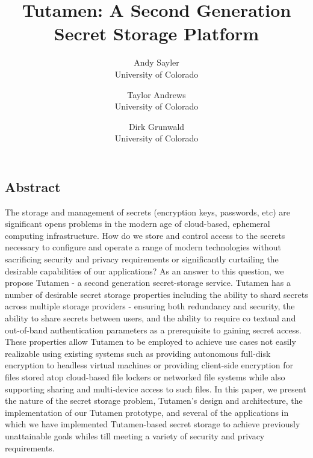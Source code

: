 \documentclass[letterpaper,twocolumn,10pt]{article}
\begin{document}
\date{}

\title{\Large \bf Tutamen: A Second Generation Secret Storage Platform}

\author{
{\rm Andy Sayler}\\
University of Colorado
\and
{\rm Taylor Andrews}\\
University of Colorado
\and
{\rm Dirk Grunwald}\\
University of Colorado
} %

\maketitle


\subsection*{Abstract}

The storage and management of secrets (encryption keys, passwords,
etc) are significant opens problems in the modern age of cloud-based,
ephemeral computing infrastructure. How do we store and control access
to the secrets necessary to configure and operate a range of modern
technologies without sacrificing security and privacy requirements or
significantly curtailing the desirable capabilities of our
applications? As an answer to this question, we propose Tutamen - a
second generation secret-storage service. Tutamen has a number of
desirable secret storage properties including the ability to shard
secrets across multiple storage providers - ensuring both redundancy
and security, the ability to share secrets between users, and the
ability to require co textual and out-of-band authentication
parameters as a prerequisite to gaining secret access. These
properties allow Tutamen to be employed to achieve use cases not
easily realizable using existing systems such as providing autonomous
full-disk encryption to headless virtual machines or providing
client-side encryption for files stored atop cloud-based file lockers
or networked file systems while also supporting sharing and
multi-device access to such files. In this paper, we present the
nature of the secret storage problem, Tutamen's design and
architecture, the implementation of our Tutamen prototype, and several
of the applications in which we have implemented Tutamen-based secret
storage to achieve previously unattainable goals whiles till meeting a
variety of security and privacy requirements.
\end{document}
